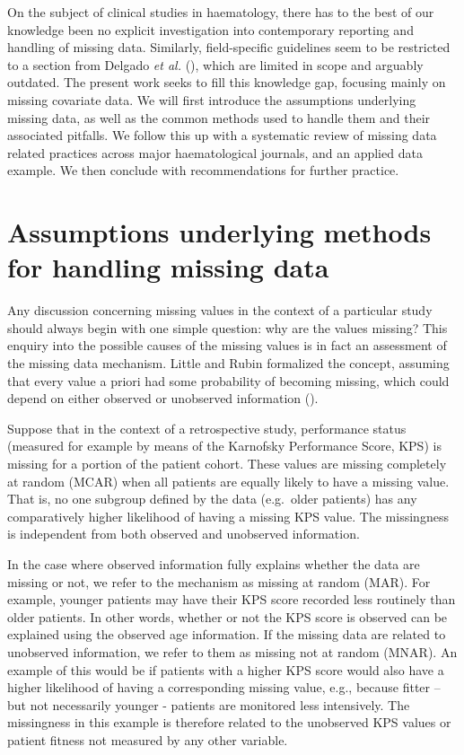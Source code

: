 \documentclass[
  letterpaper,
  DIV=11,
  numbers=noendperiod]{scrreprt}
\begin{document}
On the subject of clinical studies in haematology, there has to the best
of our knowledge been no explicit investigation into contemporary
reporting and handling of missing data. Similarly, field-specific
guidelines seem to be restricted to a section from Delgado \emph{et al.}
(), which are
limited in scope and arguably outdated. The present work seeks to fill
this knowledge gap, focusing mainly on missing covariate data. We will
first introduce the assumptions underlying missing data, as well as the
common methods used to handle them and their associated pitfalls. We
follow this up with a systematic review of missing data related
practices across major haematological journals, and an applied data
example. We then conclude with recommendations for further practice.

\section{Assumptions underlying methods for handling missing
data}\label{assumptions-underlying-methods-for-handling-missing-data}

Any discussion concerning missing values in the context of a particular
study should always begin with one simple question: why are the values
missing? This enquiry into the possible causes of the missing values is
in fact an assessment of the missing data mechanism. Little and Rubin
formalized the concept, assuming that every value a priori had some
probability of becoming missing, which could depend on either observed
or unobserved information
().

Suppose that in the context of a retrospective study, performance status
(measured for example by means of the Karnofsky Performance Score, KPS)
is missing for a portion of the patient cohort. These values are missing
completely at random (MCAR) when all patients are equally likely to have
a missing value. That is, no one subgroup defined by the data
(e.g.~older patients) has any comparatively higher likelihood of having
a missing KPS value. The missingness is independent from both observed
and unobserved information.

In the case where observed information fully explains whether the data
are missing or not, we refer to the mechanism as missing at random
(MAR). For example, younger patients may have their KPS score recorded
less routinely than older patients. In other words, whether or not the
KPS score is observed can be explained using the observed age
information. If the missing data are related to unobserved information,
we refer to them as missing not at random (MNAR). An example of this
would be if patients with a higher KPS score would also have a higher
likelihood of having a corresponding missing value, e.g., because fitter
-- but not necessarily younger - patients are monitored less
intensively. The missingness in this example is therefore related to the
unobserved KPS values or patient fitness not measured by any other
variable.
\end{document}
